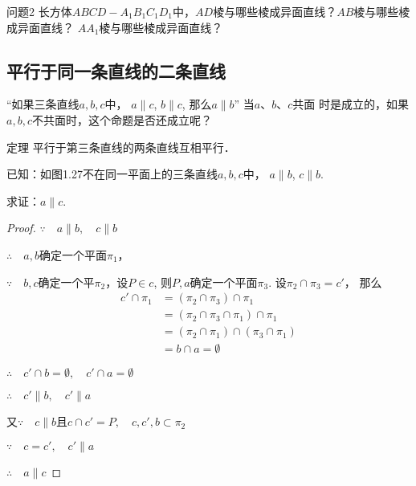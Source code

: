 \begin{blk}{问题2}
  长方体$ABCD-A_1B_1C_1D_1$中，$AD$棱与哪些棱成异面直线？$AB$棱与哪些棱成异面直线？
$AA_1$棱与哪些棱成异面直线？
\end{blk}

\subsection{平行于同一条直线的二条直线}
“如果三条直线$a,b,c$中，
$a\parallel c$, $b\parallel c$, 那么$a\parallel b$” 当$a$、$b$、$c$共面
时是成立的，如果$a,b,c$不共面时，这个命题是否还成立呢？

\begin{blk}
  {定理} 平行于第三条直线的两条直线互相平行．
\end{blk}

已知：如图1.27不在同一平面上的三条直线$a,b,c$中，
$a\parallel b$, $c\parallel b$. 

求证：$a\parallel c$.

\begin{figure}[htp]
  \centering
{}
  \caption{}
\end{figure}


\begin{proof}
  $\because\quad a\parallel b,\quad c\parallel b$

  $\therefore\quad a,b$确定一个平面$\pi_1$，

  $\because\quad b,c$确定一个平$\pi_2$，设$P\in c$, 则$P,a$确定一个平面$\pi_3$. 设$\pi_2\cap \pi_3=c'$，
  那么
\[\begin{split}
  c'\cap \pi_1&=(\pi_2\cap \pi_3)\cap \pi_1\\
  &=(\pi_2\cap \pi_3\cap \pi_1)\cap \pi_1\\
  &=(\pi_2\cap \pi_1)\cap (\pi_3\cap \pi_1)\\
  &=b\cap a=\emptyset
\end{split}\]

$\therefore\quad c'\cap b=\emptyset,\quad c'\cap a=\emptyset$

$\therefore\quad c'\parallel b,\quad c'\parallel a$

又$\because\quad c\parallel b$且$c\cap c'=P,\quad c,c',b\subset \pi_2$

$\because\quad c=c',\quad c'\parallel a$

$\therefore\quad a\parallel c$
\end{proof}

